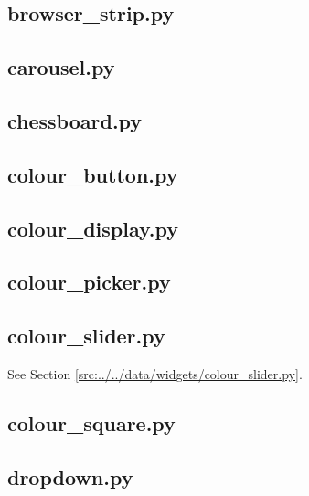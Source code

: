 \documentclass[../main/main.tex]{subfiles}
\begin{document}
\subsection{browser\_strip.py}

\label{src:data/widgets/browser_strip.py}

\subsection{carousel.py}

\label{src:data/widgets/carousel.py}

\subsection{chessboard.py}

\label{src:data/widgets/chessboard.py}

\subsection{colour\_button.py}

\label{src:data/widgets/colour_button.py}

\subsection{colour\_display.py}

\label{src:data/widgets/colour_display.py}

\subsection{colour\_picker.py}

\label{src:data/widgets/colour_picker.py}

\subsection{colour\_slider.py}
See Section \ref{src:../../data/widgets/colour_slider.py}.

\subsection{colour\_square.py}

\label{src:data/widgets/colour_square.py}

\subsection{dropdown.py}

\label{src:data/widgets/dropdown.py}
\end{document}
